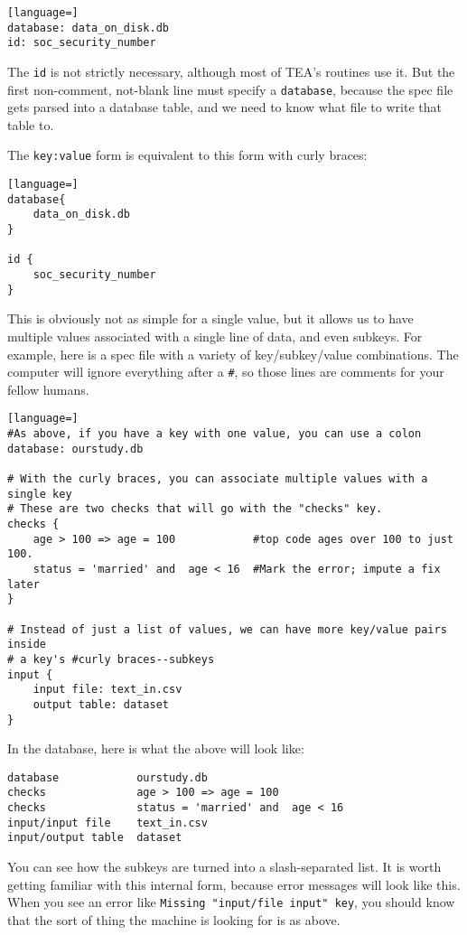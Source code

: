 \documentclass{article}
\begin{document}
\begin{lstlisting}[language=]
database: data_on_disk.db
id: soc_security_number
\end{lstlisting}

The {\tt id} is not strictly necessary, although most of TEA's routines use it. But the
first non-comment, not-blank line must specify a {\tt database}, because the spec file
gets parsed into a database table, and we need to know what file to write that table to.

The {\tt key:value} form is equivalent to this form with curly braces:

\begin{lstlisting}[language=]
database{ 
    data_on_disk.db
}

id { 
    soc_security_number
}
\end{lstlisting}

This is obviously not as simple for a single value, but it allows us to have multiple
values associated with a single line of data, and even subkeys. For example, here is
a spec file with a variety of key/subkey/value combinations. The computer will ignore
everything after a {\tt \#}, so those lines are comments for your fellow humans.

\begin{lstlisting}[language=]
#As above, if you have a key with one value, you can use a colon
database: ourstudy.db

# With the curly braces, you can associate multiple values with a single key
# These are two checks that will go with the "checks" key.
checks {
    age > 100 => age = 100            #top code ages over 100 to just 100.
    status = 'married' and  age < 16  #Mark the error; impute a fix later
}

# Instead of just a list of values, we can have more key/value pairs inside 
# a key's #curly braces--subkeys
input { 
    input file: text_in.csv
    output table: dataset
}

\end{lstlisting}

In the database, here is what the above will look like:
\begin{verbatim}
database            ourstudy.db
checks              age > 100 => age = 100
checks              status = 'married' and  age < 16
input/input file    text_in.csv
input/output table  dataset
\end{verbatim}
You can see how the subkeys are turned into a slash-separated list. It is worth getting
familiar with this internal form, because error messages will look like this. When you
see an error like {\tt Missing "input/file input" key}, you should know that the sort of
thing the machine is looking for is as above.
\end{document}
